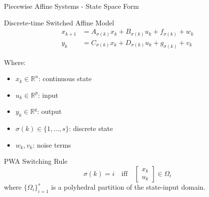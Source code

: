 \documentclass[aspectratio=169]{beamer}
\begin{document}
\begin{frame}{Piecewise Affine Systems - State Space Form}
\begin{block}{Discrete-time Switched Affine Model}
\begin{align}
x_{k+1} &= A_{\sigma(k)} x_k + B_{\sigma(k)} u_k + f_{\sigma(k)} + w_k \\
y_k &= C_{\sigma(k)} x_k + D_{\sigma(k)} u_k + g_{\sigma(k)} + v_k
\end{align}
\end{block}

Where:
\begin{itemize}
\item $x_k \in \mathbb{R}^n$: continuous state
\item $u_k \in \mathbb{R}^p$: input
\item $y_k \in \mathbb{R}^q$: output
\item $\sigma(k) \in \{1, \ldots, s\}$: discrete state
\item $w_k, v_k$: noise terms
\end{itemize}

\begin{block}{PWA Switching Rule}
$$\sigma(k) = i \quad \text{iff} \quad \begin{bmatrix} x_k \\ u_k \end{bmatrix} \in \Omega_i$$
where $\{\Omega_i\}_{i=1}^s$ is a polyhedral partition of the state-input domain.
\end{block}
\end{frame}
\end{document}
